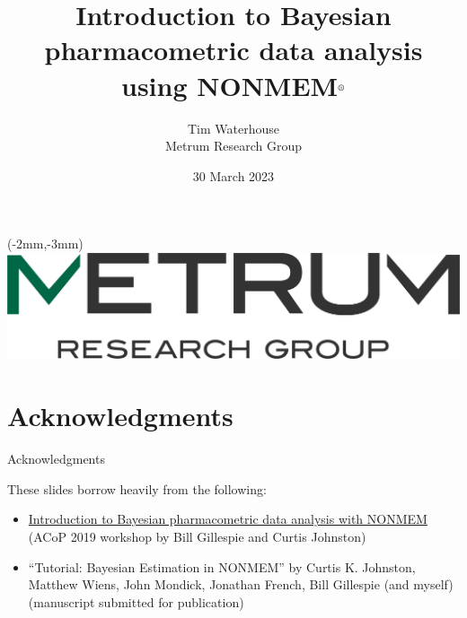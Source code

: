 \documentclass[handout]{beamer}
\title[Bayesian data analysis using NONMEM$^\text{\textregistered}$]{Introduction to
  Bayesian pharmacometric data analysis using NONMEM$^\text{\textregistered}$}
\author{Tim Waterhouse\\
Metrum Research Group}
\date{30 March 2023}
\begin{document}
 
\begin{frame}

\begin{textblock*}{80mm}(-2mm,-3mm)
\includegraphics[scale=0.2]{graphics/metrum_new_logo.png}
\end{textblock*}




\titlepage



\end{frame}

\section{Acknowledgments}

\begin{frame}{Acknowledgments}

  These slides borrow heavily from the following:

  \begin{itemize}
    \item \href{https://metrumrg.com/course/introduction-to-bayesian-pharmacometric-data-analysis-with-nonmem/}{Introduction to Bayesian pharmacometric data analysis with NONMEM} (ACoP 2019 workshop by Bill Gillespie and Curtis Johnston)
    \item ``Tutorial: Bayesian Estimation in NONMEM'' by Curtis K. Johnston,
    Matthew Wiens,
    John Mondick,
    Jonathan French,
    Bill Gillespie (and myself)
     (manuscript submitted for publication)
  \end{itemize}
\end{frame}
\end{document}
